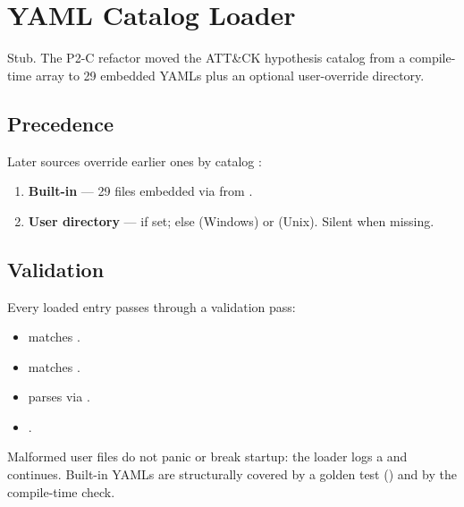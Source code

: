 \chapter{YAML Catalog Loader}
\label{ch:catalog-yaml}

\begin{note}
Stub. The P2-C refactor moved the ATT\&CK hypothesis catalog from
a compile-time  array to 29 embedded YAMLs plus an
optional user-override directory.
\end{note}

\section{Precedence}

Later sources override earlier ones by catalog :
\begin{enumerate}
    \item \textbf{Built-in} --- 29 files embedded via
         from
        .
    \item \textbf{User directory} ---
         if set; else
         (Windows) or
         (Unix). Silent when
        missing.
\end{enumerate}

\section{Validation}

Every loaded entry passes through a validation pass:

\begin{itemize}
    \item {} matches \code{[A-Za-z0-9\-\_]+}.
    \item {} matches .
    \item {} parses via .
    \item {}.
\end{itemize}

Malformed user files do not panic or break startup: the loader logs
a  and continues. Built-in YAMLs are
structurally covered by a golden test
() and by
the  compile-time check.

